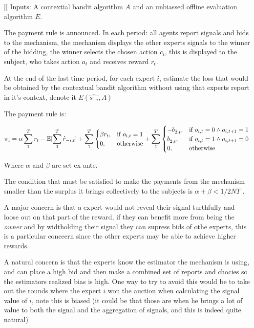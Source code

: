 \begin{mech}\label{mech:bidbandit}[]
Inputs: A contextial bandit algorithm $A$ and an unbiassed offline evaluation algorithm $E$.



The payment rule is announced.
 In each period: all agents report signals and bids to the mechanism, the mechanism displays the other experts signals to the winner of the bidding, the winner selects the chosen action $c_t$, this is displayed to the subject, who takes action $a_t$ and receives reward $r_t$.

At the end of the last time period, for each expert $i$, estimate the loss that would be obtained by the contextual bandit algorithm without using that experts report in it's context, denote it $E(\hat{s_{-i}},A)$



The payment rule is:

\[
    \pi_i = 
\alpha \sum_1^T r_t -  \expec[\sum_1^T \hat{r}_{-i,t}]
+
\sum_1^T
\begin{cases}
    \beta r_t ,& \text{if } o_{i,t} = 1\\
     0,              & \text{otherwise}
\end{cases}
+
\sum_1^T
\begin{cases}
     - b_{\hat{2},t} ,& \text{if } o_{i,t} = 0 \land o_{i,t+1} = 1\\
       b_{\hat{2},t} ,& \text{if } o_{i,t} = 1 \land o_{i,t+1} = 0 \\
	   0,              & \text{otherwise}
\end{cases}
\]

Where $\alpha$ and $\beta$ are set ex ante. 
\end{mech}


The condition that must be satisfied to make the payments from the mechanism smaller than the surplus it brings collectively to the subjects is $ \alpha + \beta < 1/2NT$ .



 A major concern is that a expert would not reveal their signal turthfully and loose out on that part of the reward, if they can benefit more from being the \emph{owner} and by widtholding their signal they can supress bids of othe experts, this is a particular conceern since the other experts may be able to achieve higher rewards.

A natural concern is that the experts know the estimator the mechanism is using, and can place a high bid and then make a combined set of reports and chocies so the estimators realized bias is high.
One way to try to avoid this would be to take out the rounds where the expert $i$ won the auction when calculating the signal value of $i$, note this is biased (it could be that those are when he brings a lot of value to both the signal and the aggregation of signals, and this is indeed quite natural)






